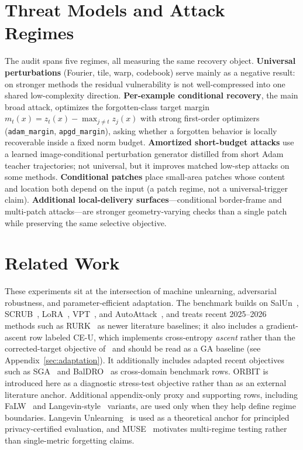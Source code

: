 \documentclass[11pt]{article}
\begin{document}
\section{Threat Models and Attack Regimes}
The audit spans five regimes, all measuring the same recovery object. \textbf{Universal perturbations} (Fourier, tile, warp, codebook) serve mainly as a negative result: on stronger methods the residual vulnerability is not well-compressed into one shared low-complexity direction. \textbf{Per-example conditional recovery}, the main broad attack, optimizes the forgotten-class target margin $m_t(x) = z_t(x) - \max_{j \neq t} z_j(x)$ with strong first-order optimizers (\texttt{adam\_margin}, \texttt{apgd\_margin}), asking whether a forgotten behavior is locally recoverable inside a fixed norm budget. \textbf{Amortized short-budget attacks} use a learned image-conditional perturbation generator distilled from short Adam teacher trajectories; not universal, but it improves matched low-step attacks on some methods. \textbf{Conditional patches} place small-area patches whose content and location both depend on the input (a patch regime, not a universal-trigger claim). \textbf{Additional local-delivery surfaces}---conditional border-frame and multi-patch attacks---are stronger geometry-varying checks than a single patch while preserving the same selective objective.



\section{Related Work}
These experiments sit at the intersection of machine unlearning, adversarial robustness, and parameter-efficient adaptation. The benchmark builds on SalUn~\cite{fan2024salun}, SCRUB~\cite{kurmanji2023scrub}, LoRA~\cite{hu2022lora}, VPT~\cite{jia2022vpt}, and AutoAttack~\cite{croce2020autoattack}, and treats recent 2025--2026 methods such as RURK~\cite{hsu2025rurk} as newer literature baselines; it also includes a gradient-ascent row labeled CE-U, which implements cross-entropy \emph{ascent} rather than the corrected-target objective of~\cite{yang2025ceu} and should be read as a GA baseline (see Appendix~\ref{sec:adaptation}). It additionally includes adapted recent objectives such as SGA~\cite{pang2025sga} and BalDRO~\cite{shao2026baldro} as cross-domain benchmark rows. ORBIT is introduced here as a diagnostic stress-test objective rather than as an external literature anchor. Additional appendix-only proxy and supporting rows, including FaLW~\cite{yu2026falw} and Langevin-style~\cite{chien2024langevin} variants, are used only when they help define regime boundaries. Langevin Unlearning~\cite{chien2024langevin} is used as a theoretical anchor for principled privacy-certified evaluation, and MUSE~\cite{shi2024muse} motivates multi-regime testing rather than single-metric forgetting claims.
\end{document}
